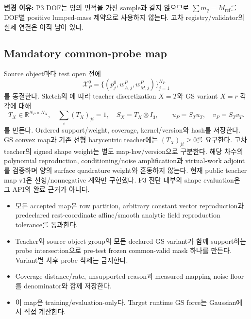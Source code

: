 \documentclass[10pt]{article}
\begin{document}
\textbf{변경 이유:} P3 DOF는 양의 면적을 가진 sample과 같지 않으므로
\(\sum m_q=M_{\mathrm{ref}}\)를 DOF별 positive lumped-mass 제약으로 사용하지 않는다.
고차 registry/validator의 실제 연결은 아직 남아 있다.

\subsection{Mandatory common-probe map}

Source object마다 test open 전에
\[
  \mathcal X_P^0=\{(p_j^0,w_{A,j}^P,w_{M,j}^P)\}_{j=1}^{N_P}
\]
를 동결한다. Sketch의 에 따라
teacher discretization \(X=T\)와 GS variant \(X=r\) 각각에 대해
\begin{equation}
 T_X\in\mathbb R^{N_P\times N_X},\quad
 \sum_i(T_X)_{ji}=1,\quad S_X=T_X\otimes I_3,\qquad
 u_P=S_Tu_T,\quad v_P=S_Tv_T.
 \label{eq:r1-probe-map}
\end{equation}
를 만든다. Ordered support/weight, coverage, kernel/version와 hash를 저장한다.
GS convex map과 기존 선형 barycentric teacher에는 \((T_X)_{ji}\ge0\)를 요구한다.
고차 teacher의 signed shape weight는 별도 map-law/version으로 구분한다.
해당 차수의 polynomial reproduction, conditioning/noise amplification과 virtual-work adjoint를
검증하며 양의 surface quadrature weight와 혼동하지 않는다. 현재 public teacher map v1은
선형/nonnegative 계약만 구현했다. P3 진단 내부의 shape evaluation은 그 API의 완료 근거가 아니다.

\begin{itemize}
  \item 모든 accepted map은 row partition, arbitrary constant vector reproduction과 predeclared
  rest-coordinate affine/smooth analytic field reproduction tolerance를 통과한다.
  \item Teacher와 source-object group의 모든 declared GS variant가 함께 support하는 probe intersection으로
  pre-test frozen common-valid mask 하나를 만든다. Variant별 사후 probe 삭제는 금지한다.
  \item Coverage distance/rate, unsupported reason과 measured mapping-noise floor를 denominator와 함께 저장한다.
  \item 이 map은 training/evaluation-only다. Target runtime GS force는 Gaussian에서 직접 계산한다.
\end{itemize}
\end{document}

